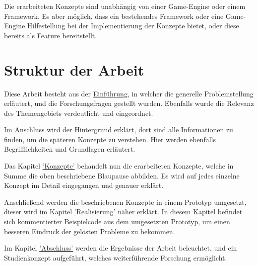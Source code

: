 Die erarbeiteten Konzepte sind unabhängig von einer Game-Engine oder einem Framework. Es aber möglich, dass ein bestehendes Framework oder eine Game-Engine Hilfestellung bei der Implementierung der Konzepte bietet, oder diese bereits als Feature bereitstellt.

\section{Struktur der Arbeit}

Diese Arbeit besteht aus der \hyperref[sec:einfuehrung]{Einführung}, in welcher die generelle Problemstellung erläutert, und die Forschungsfragen gestellt wurden. Ebenfalls wurde die Relevanz des Themengebiets verdeutlicht und eingeordnet.

Im Anschluss wird der \hyperref[sec:hintergrund]{Hintergrund} erklärt, dort sind alle Informationen zu finden, um die späteren Konzepte zu verstehen. Hier werden ebenfalls Begrifflichkeiten und Grundlagen erläutert.

Das Kapitel \hyperref[sec:konzepte]{'Konzepte'} behandelt nun die erarbeiteten Konzepte, welche in Summe die oben beschriebene Blaupause abbilden. Es wird auf jedes einzelne Konzept im Detail eingegangen und genauer erklärt. 
 
Anschließend werden die beschriebenen Konzepte in einem Prototyp umgesetzt, dieser wird im Kapitel \hyperref[sec:realisierung]'{Realisierung'} näher erklärt. In diesem Kapitel befindet sich kommentierter Beispielcode aus dem umgesetzten Prototyp, um einen besseren Eindruck der gelösten Probleme zu bekommen.

Im Kapitel \hyperref[sec:zusammenfassung]{'Abschluss'} werden die Ergebnisse der Arbeit beleuchtet, und ein Studienkonzept aufgeführt, welches weiterführende Forschung ermöglicht.
